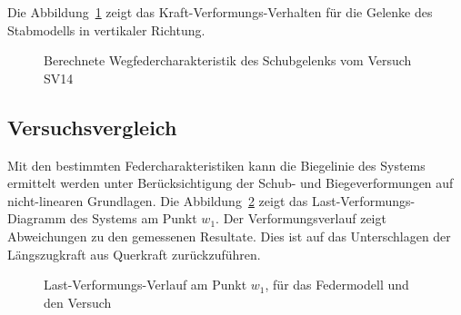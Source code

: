 \documentclass[
  11pt,
  letterpaper,
]{scrreprt}
\begin{document}
Die Abbildung~\ref{fig-wegfeder-schub-sv14} zeigt das
Kraft-Verformungs-Verhalten für die Gelenke des Stabmodells in
vertikaler Richtung.

\begin{figure}[H]


\caption{\label{fig-wegfeder-schub-sv14}Berechnete
Wegfedercharakteristik des Schubgelenks vom Versuch SV14}

\end{figure}%

\subsection{Versuchsvergleich}\label{versuchsvergleich-1}

Mit den bestimmten Federcharakteristiken kann die Biegelinie des Systems
ermittelt werden unter Berücksichtigung der Schub- und Biegeverformungen
auf nicht-linearen Grundlagen. Die Abbildung~\ref{fig-l-w-sv14} zeigt
das Last-Verformungs-Diagramm des Systems am Punkt \(w_1\). Der
Verformungsverlauf zeigt Abweichungen zu den gemessenen Resultate. Dies
ist auf das Unterschlagen der Längszugkraft aus Querkraft
zurückzuführen.

\begin{figure}[H]


\caption{\label{fig-l-w-sv14}Last-Verformungs-Verlauf am Punkt \(w_1\),
für das Federmodell und den Versuch}

\end{figure}%
\end{document}
